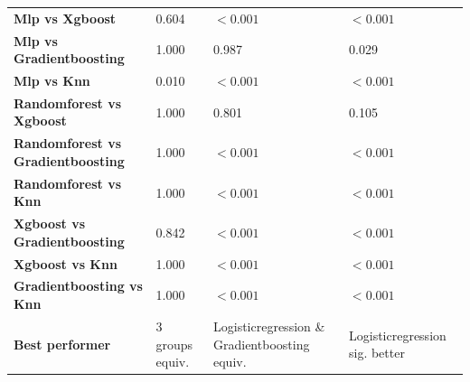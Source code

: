 \begin{table}[H]
{\begin{tabular}{llll}
        \textbf{Mlp vs Xgboost} & 0.604 & $< 0.001$ & $< 0.001$ \\
        \textbf{Mlp vs Gradientboosting} & 1.000 & 0.987 & 0.029 \\
        \textbf{Mlp vs Knn} & 0.010 & $< 0.001$ & $< 0.001$ \\
        \textbf{Randomforest vs Xgboost} & 1.000 & 0.801 & 0.105 \\
        \textbf{Randomforest vs Gradientboosting} & 1.000 & $< 0.001$ & $< 0.001$ \\
        \textbf{Randomforest vs Knn} & 1.000 & $< 0.001$ & $< 0.001$ \\
        \textbf{Xgboost vs Gradientboosting} & 0.842 & $< 0.001$ & $< 0.001$ \\
        \textbf{Xgboost vs Knn} & 1.000 & $< 0.001$ & $< 0.001$ \\
        \textbf{Gradientboosting vs Knn} & 1.000 & $< 0.001$ & $< 0.001$ \\
        \textbf{Best performer} & 3 groups equiv. & Logisticregression \& Gradientboosting equiv. & Logisticregression sig. better \\
        \bottomrule
    \end{tabular}}
\end{table}